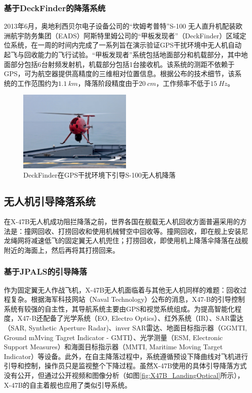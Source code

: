 \subsubsection{基于DeckFinder的降落系统}
2013年6月，奥地利西贝尔电子设备公司的“坎姆考普特”S-100 无人直升机配装欧洲航宇防务集团（EADS）阿斯特里姆公司的“甲板发现者”（DeckFinder）区域定位系统，在一周的时间内完成了一系列旨在演示验证GPS干扰环境中无人机自动起飞与回收能力的飞行试验。“甲板发现者”系统\cite{Deckfinder}包括地面部分和机载部分，其中地面部分包括6台射频发射机，机载部分包括1台接收机。该系统的测距不依赖于GPS，可为航空器提供高精度的三维相对位置信息。根据公布的技术细节，该系统的工作范围约为$1.1\ km$，降落阶段精度由于$20\ cm$，工作频率不低于$15\ Hz$。
\begin{figure}[!tb]   
	\centering	
	\includegraphics[width=0.5\textwidth]{Figs/28_Deckfinder.jpg}
	\caption{DeckFinder在GPS干扰环境下引导S-100无人机降落}
	\label{fig:28_Deckfinder}
\end{figure}


\subsection{无人机引导降落系统}

在X-47B无人机成功阻拦降落之前，世界各国在舰载无人机回收方面普遍采用的方法是：撞网回收、打捞回收和使用机械臂空中回收等。撞网回收，即在舰上安装尼龙绳网将减速低飞的固定翼无人机兜住；打捞回收，即使用机上降落伞降落在战舰附近的海面上，然后再将其打捞回来。

\subsubsection{基于JPALS的引导降落}
作为固定翼无人作战飞机，X-47B无人机面临着与其他无人机同样的难题：回收过程复杂。根据海军科技网站（Naval Technology）公布的消息\cite{X_47B_UCAS}，X47-B的引导控制系统有较强的自主性，其导航系统主要由GPS和视觉系统组成。为提高智能化程度，X47-B还配备了光学系统（EO, Electro Optics）、红外系统（IR）、SAR雷达（SAR, Synthetic Aperture Radar)、inver SAR雷达、地面目标指示器（GGMTI, Ground mMving Tagret Indicator - GMTI）、光学测量（ESM, Electronic Support Measures）和海面目标指示器（MMTI, Maritime Moving Target Indicator）等设备。此外，在自主降落过程中，系统遵循预设下降曲线对飞机进行引导和控制，操作员只是监视整个下降过程。虽然X-47B使用的具体引导降落方式没有公开，但通过公开视频和图像分析（如图\ref{fig:X47B_LandingOptical}所示），X-47B的自主着舰也应用了类似引导系统。

